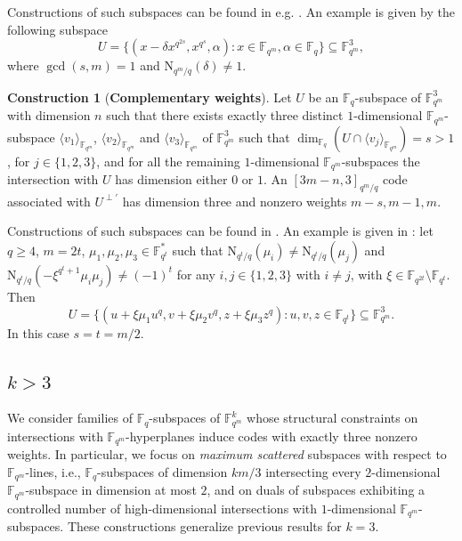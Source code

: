 \documentclass[11pt]{amsart}
\theoremstyle{definition}
\newtheorem{construction}[theorem]{Construction}
\newcommand{\F}{{\mathbb F}}
\newcommand{\fq}{{\mathbb F}_{q}}
\newcommand{\N}{\mathrm{N}}
\begin{document}
Constructions of such subspaces can be found in e.g. \cite{lunardon2001blocking,Polverinothesis}.
An example is given by the following subspace
\[ U=\{(x-\delta x^{q^{2s}},x^{q^s},\alpha)\colon x \in \F_{q^m},\alpha \in \fq\}\subseteq \mathbb{F}_{q^m}^3, \]
where $\gcd(s,m)=1$ and $\N_{q^m/q}(\delta)\ne 1$.

\begin{construction}[\textbf{Complementary weights}]\label{con:complplane}
Let $U$ be an $\fq$-subspace of $\F_{q^m}^3$ with dimension $n$ such that there exists exactly three distinct $1$-dimensional $\F_{q^m}$-subspace $\langle v_1 \rangle_{\F_{q^m}}$, $\langle v_2 \rangle_{\F_{q^m}}$ and $\langle v_3 \rangle_{\F_{q^m}}$ of $\F_{q^m}^3$ such that $\dim_{\fq}(U\cap \langle v_j \rangle_{\F_{q^m}})=s>1$, for $j \in \{1,2,3\}$, and for all the remaining $1$-dimensional $\F_{q^m}$-subspaces the intersection with $U$ has dimension either $0$ or $1$.
An $[3m-n,3]_{q^m/q}$ code associated with $U^{\perp'}$ has dimension three and nonzero weights $m-s,m-1,m$.
\end{construction}

Constructions of such subspaces can be found in \cite{zullo2021multi}.
An example is given in \cite[Corollary 6.8]{zullo2021multi}:
let $q\geq 4$, $m=2t$, $\mu_1,\mu_2,\mu_3 \in \F_{q^t}^*$ such that $\N_{q^t/q}(\mu_i) \neq \N_{q^t/q}(\mu_j)$ and $\N_{q^{t}/q}(-\xi^{q^t+1}\mu_i\mu_j)\neq (-1)^t$ for any $i,j \in \{1,2,3\}$ with $i\ne j$, 
with $\xi \in \F_{q^{2t}}\setminus\F_{q^t}$.
Then
\[ U=\{ (u+\xi \mu_1 u^{q},v+\xi \mu_2 v^{q},z+\xi \mu_3 z^{q}) \colon u,v,z \in \F_{q^t} \} \subseteq \F_{q^m}^3. \]
In this case $s=t=m/2$.

\subsection{$k>3$}

We consider families of $\mathbb{F}_q$-subspaces of $\mathbb{F}_{q^m}^k$ whose structural constraints on intersections with $\mathbb{F}_{q^m}$-hyperplanes induce codes with exactly three nonzero weights. In particular, we focus on \emph{maximum scattered} subspaces with respect to $\F_{q^m}$-lines, i.e., $\fq$-subspaces of dimension $km/3$ intersecting every $2$-dimensional $\F_{q^m}$-subspace in dimension at most $2$, and on duals of subspaces exhibiting a controlled number of high-dimensional intersections with $1$-dimensional $\F_{q^m}$-subspaces. These constructions generalize previous results for $k=3$.
\end{document}
